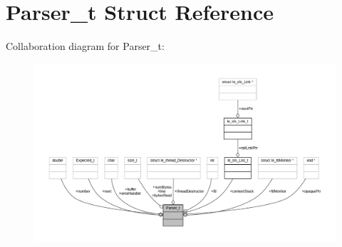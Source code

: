 \hypertarget{struct_parser__t}{}\section{Parser\+\_\+t Struct Reference}
\label{struct_parser__t}


Collaboration diagram for Parser\+\_\+t\+:
\nopagebreak
\begin{figure}[H]
\begin{center}
\leavevmode
\includegraphics[width=350pt]{struct_parser__t__coll__graph}
\end{center}
\end{figure}
